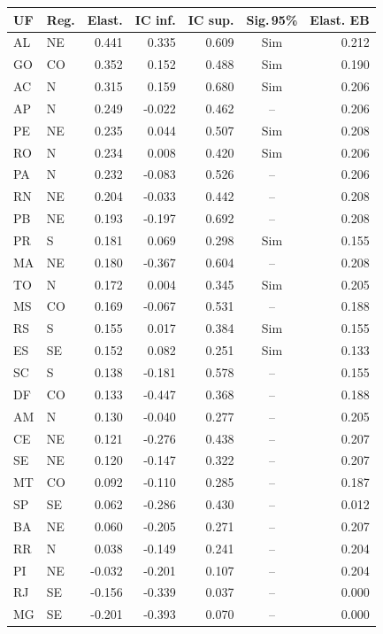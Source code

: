 \begin{tabular}{llrrrcr}
\toprule
UF & Reg. & Elast. & IC inf. & IC sup. & Sig.\,95\% & Elast. EB \\
\midrule
AL & NE & 0.441 & 0.335 & 0.609 & Sim & 0.212 \\
GO & CO & 0.352 & 0.152 & 0.488 & Sim & 0.190 \\
AC & N & 0.315 & 0.159 & 0.680 & Sim & 0.206 \\
AP & N & 0.249 & -0.022 & 0.462 & -- & 0.206 \\
PE & NE & 0.235 & 0.044 & 0.507 & Sim & 0.208 \\
RO & N & 0.234 & 0.008 & 0.420 & Sim & 0.206 \\
PA & N & 0.232 & -0.083 & 0.526 & -- & 0.206 \\
RN & NE & 0.204 & -0.033 & 0.442 & -- & 0.208 \\
PB & NE & 0.193 & -0.197 & 0.692 & -- & 0.208 \\
PR & S & 0.181 & 0.069 & 0.298 & Sim & 0.155 \\
MA & NE & 0.180 & -0.367 & 0.604 & -- & 0.208 \\
TO & N & 0.172 & 0.004 & 0.345 & Sim & 0.205 \\
MS & CO & 0.169 & -0.067 & 0.531 & -- & 0.188 \\
RS & S & 0.155 & 0.017 & 0.384 & Sim & 0.155 \\
ES & SE & 0.152 & 0.082 & 0.251 & Sim & 0.133 \\
SC & S & 0.138 & -0.181 & 0.578 & -- & 0.155 \\
DF & CO & 0.133 & -0.447 & 0.368 & -- & 0.188 \\
AM & N & 0.130 & -0.040 & 0.277 & -- & 0.205 \\
CE & NE & 0.121 & -0.276 & 0.438 & -- & 0.207 \\
SE & NE & 0.120 & -0.147 & 0.322 & -- & 0.207 \\
MT & CO & 0.092 & -0.110 & 0.285 & -- & 0.187 \\
SP & SE & 0.062 & -0.286 & 0.430 & -- & 0.012 \\
BA & NE & 0.060 & -0.205 & 0.271 & -- & 0.207 \\
RR & N & 0.038 & -0.149 & 0.241 & -- & 0.204 \\
PI & NE & -0.032 & -0.201 & 0.107 & -- & 0.204 \\
RJ & SE & -0.156 & -0.339 & 0.037 & -- & 0.000 \\
MG & SE & -0.201 & -0.393 & 0.070 & -- & 0.000 \\
\bottomrule
\end{tabular}
